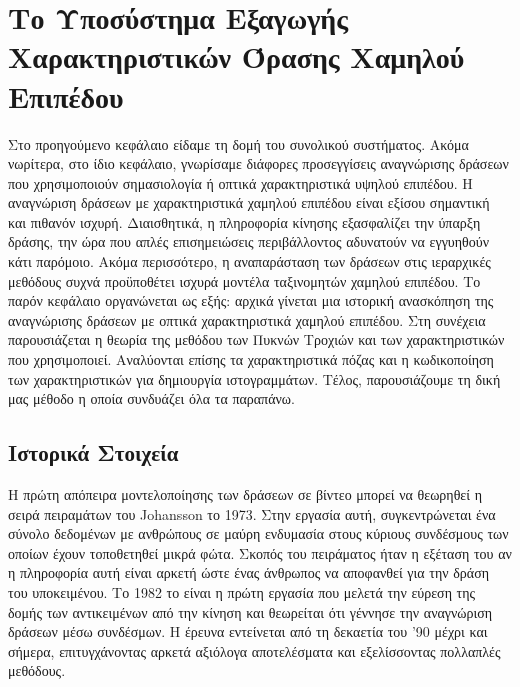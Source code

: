 \documentclass[11pt,a4paper,english,greek,twoside]{../Thesis}
\begin{document}
\chapter{Το Υποσύστημα Εξαγωγής Χαρακτηριστικών Όρασης Χαμηλού Επιπέδου}\label{chap:Methodology}
Στο προηγούμενο κεφάλαιο είδαμε τη δομή του συνολικού συστήματος. Ακόμα νωρίτερα, στο ίδιο κεφάλαιο, γνωρίσαμε διάφορες προσεγγίσεις αναγνώρισης δράσεων που χρησιμοποιούν σημασιολογία ή οπτικά χαρακτηριστικά υψηλού επιπέδου. Η αναγνώριση δράσεων με χαρακτηριστικά χαμηλού επιπέδου είναι εξίσου σημαντική και πιθανόν ισχυρή. Διαισθητικά, η πληροφορία κίνησης εξασφαλίζει την ύπαρξη δράσης, την ώρα που απλές επισημειώσεις περιβάλλοντος αδυνατούν να εγγυηθούν κάτι παρόμοιο. Ακόμα περισσότερο, η αναπαράσταση των δράσεων στις ιεραρχικές μεθόδους συχνά προϋποθέτει ισχυρά μοντέλα ταξινομητών χαμηλού επιπέδου. Το παρόν κεφάλαιο οργανώνεται ως εξής: αρχικά γίνεται μια ιστορική ανασκόπηση της αναγνώρισης δράσεων με οπτικά χαρακτηριστικά χαμηλού επιπέδου. Στη συνέχεια παρουσιάζεται η θεωρία της μεθόδου των Πυκνών Τροχιών και των χαρακτηριστικών που χρησιμοποιεί. Αναλύονται επίσης τα χαρακτηριστικά πόζας και η κωδικοποίηση των χαρακτηριστικών για δημιουργία ιστογραμμάτων. Τέλος, παρουσιάζουμε τη δική μας μέθοδο η οποία συνδυάζει όλα τα παραπάνω.


\section{Ιστορικά Στοιχεία}
Η πρώτη απόπειρα μοντελοποίησης των δράσεων σε βίντεο μπορεί να θεωρηθεί η σειρά πειραμάτων του Johansson \cite{johansson_1973} το 1973. Στην εργασία αυτή, συγκεντρώνεται ένα σύνολο δεδομένων με ανθρώπους σε μαύρη ενδυμασία στους κύριους συνδέσμους των οποίων έχουν τοποθετηθεί μικρά φώτα. Σκοπός του πειράματος ήταν η εξέταση του αν η πληροφορία αυτή είναι αρκετή ώστε ένας άνθρωπος να αποφανθεί για την δράση του υποκειμένου. Το 1982 το \cite{webb_1982} είναι η πρώτη εργασία που μελετά την εύρεση της δομής των αντικειμένων από την κίνηση και θεωρείται ότι γέννησε την αναγνώριση δράσεων μέσω συνδέσμων. Η έρευνα εντείνεται από τη δεκαετία του '90 μέχρι και σήμερα, επιτυγχάνοντας αρκετά αξιόλογα αποτελέσματα και εξελίσσοντας πολλαπλές μεθόδους.
\end{document}
